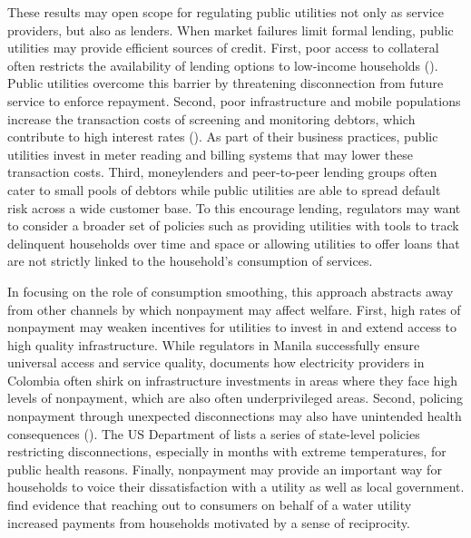 \documentclass[12pt,table]{article}
\begin{document}
These results may open scope for regulating public utilities not only as service providers, but also as lenders.  When market failures limit formal lending, public utilities may provide efficient sources of credit.  First, poor access to collateral often restricts the availability of lending options to low-income households (\cite{jack2016borrowing}).  Public utilities overcome this barrier by threatening disconnection from future service to enforce repayment.  Second, poor infrastructure and mobile populations increase the transaction costs of screening and monitoring debtors, which contribute to high interest rates (\cite{jack2014risk}).  As part of their business practices, public utilities invest in meter reading and billing systems that may lower these transaction costs.  Third, moneylenders and peer-to-peer lending groups often cater to small pools of debtors while public utilities are able to spread default risk across a wide customer base.  To this encourage lending, regulators may want to consider a broader set of policies such as providing utilities with tools to track delinquent households over time and space or allowing utilities to offer loans that are not strictly linked to the household's consumption of services.  

In focusing on the role of consumption smoothing, this approach abstracts away from other channels by which nonpayment may affect welfare.  First, high rates of nonpayment may weaken incentives for utilities to invest in and extend access to high quality infrastructure.  While regulators in Manila successfully ensure universal access and service quality, \cite{mcrae2015infrastructure} documents how electricity providers in Colombia often shirk on infrastructure investments in areas where they face high levels of nonpayment, which are also often underprivileged areas.  Second, policing nonpayment through unexpected disconnections may also have unintended health consequences (\cite{franklin2017}).  The US Department of \cite{liheap} lists a series of state-level policies restricting disconnections, especially in months with extreme temperatures, for public health reasons.  Finally, nonpayment may provide an important way for households to voice their dissatisfaction with a utility as well as local government.  \cite{szabo2015reducing} find evidence that reaching out to consumers on behalf of a water utility increased payments from households motivated by a sense of reciprocity.  

\end{document}
